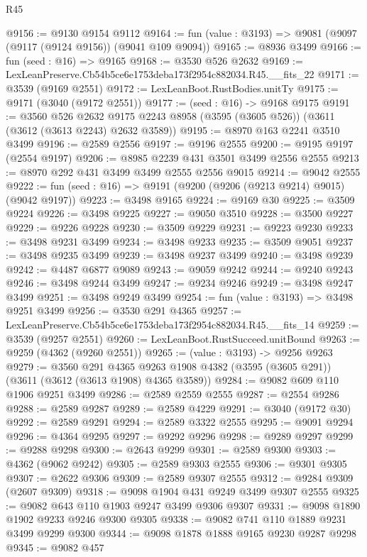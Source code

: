\begin{lexlean}{R45}
\begin{coremodule}
@9156 := @9130 @9154 @9112
@9164 := fun (value : @3193) => @9081 (@9097 (@9117 (@9124 @9156)) (@9041 @109 @9094))
@9165 := @8936 @3499
@9166 := fun (seed : @16) => @9165
@9168 := @3530 @526 @2632
@9169 := LexLeanPreserve.Cb54b5ce6e1753deba173f2954c882034.R45.__fits_22
@9171 := @3539 (@9169 @2551)
@9172 := LexLeanBoot.RustBodies.unitTy
@9175 := @9171 (@3040 (@9172 @2551))
@9177 := (seed : @16) -> @9168 @9175
@9191 := @3560
    @526
    @2632
    @9175
    @2243
    @8958
    (@3595 (@3605 @526))
    (@3611 (@3612 (@3613 @2243) @2632 @3589))
@9195 := @8970 @163 @2241 @3510 @3499
@9196 := @2589 @2556
@9197 := @9196 @2555
@9200 := @9195 @9197 (@2554 @9197)
@9206 := @8985 @2239 @431 @3501 @3499 @2556 @2555
@9213 := @8970 @292 @431 @3499 @3499 @2555 @2556 @9015
@9214 := @9042 @2555
@9222 := fun (seed : @16) => @9191 (@9200 (@9206 (@9213 @9214) @9015) (@9042 @9197))
@9223 := @3498 @9165
@9224 := @9169 @30
@9225 := @3509 @9224
@9226 := @3498 @9225
@9227 := @9050 @3510
@9228 := @3500 @9227
@9229 := @9226 @9228
@9230 := @3509 @9229
@9231 := @9223 @9230
@9233 := @3498 @9231 @3499
@9234 := @3498 @9233
@9235 := @3509 @9051
@9237 := @3498 @9235 @3499
@9239 := @3498 @9237 @3499
@9240 := @3498 @9239
@9242 := @4487 @6877 @9089
@9243 := @9059 @9242
@9244 := @9240 @9243
@9246 := @3498 @9244 @3499
@9247 := @9234 @9246
@9249 := @3498 @9247 @3499
@9251 := @3498 @9249 @3499
@9254 := fun (value : @3193) => @3498 @9251 @3499
@9256 := @3530 @291 @4365
@9257 := LexLeanPreserve.Cb54b5ce6e1753deba173f2954c882034.R45.__fits_14
@9259 := @3539 (@9257 @2551)
@9260 := LexLeanBoot.RustSucceed.unitBound
@9263 := @9259 (@4362 (@9260 @2551))
@9265 := (value : @3193) -> @9256 @9263
@9279 := @3560
    @291
    @4365
    @9263
    @1908
    @4382
    (@3595 (@3605 @291))
    (@3611 (@3612 (@3613 @1908) @4365 @3589))
@9284 := @9082 @609 @110 @1906 @9251 @3499
@9286 := @2589 @2559 @2555
@9287 := @2554 @9286
@9288 := @2589 @9287
@9289 := @2589 @4229
@9291 := @3040 (@9172 @30)
@9292 := @2589 @9291
@9294 := @2589 @3322 @2555
@9295 := @9091 @9294
@9296 := @4364 @9295
@9297 := @9292 @9296
@9298 := @9289 @9297
@9299 := @9288 @9298
@9300 := @2643 @9299
@9301 := @2589 @9300
@9303 := @4362 (@9062 @9242)
@9305 := @2589 @9303 @2555
@9306 := @9301 @9305
@9307 := @2622 @9306
@9309 := @2589 @9307 @2555
@9312 := @9284 @9309 (@2607 @9309)
@9318 := @9098 @1904 @431 @9249 @3499 @9307 @2555
@9325 := @9082 @643 @110 @1903 @9247 @3499 @9306 @9307
@9331 := @9098 @1890 @1902 @9233 @9246 @9300 @9305
@9338 := @9082 @741 @110 @1889 @9231 @3499 @9299 @9300
@9344 := @9098 @1878 @1888 @9165 @9230 @9287 @9298
@9345 := @9082 @457

\end{coremodule}
\end{lexlean}
